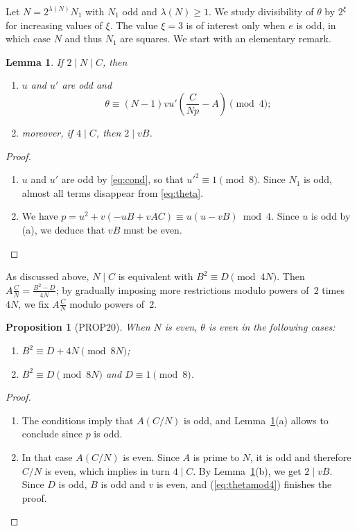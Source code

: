 \documentclass[12pt,twoside,leqno]{article}
\newtheorem{proposition}[theorem]{Proposition}
\newtheorem{lemma}[theorem]{Lemma}
\numberwithin{equation}{section}
\renewcommand{\geq}{\geqslant}
\newenvironment {alphenumerate}
   {\renewcommand {\labelenumi}{(\alph {enumi})}
    \renewcommand {\labelenumii}{(\alph {enumi}\arabic {enumii})}
    \begin {enumerate}}
   {\end {enumerate}}
\begin{document}
Let $N = 2^{\lambda (N)} N_1$ with $N_1$ odd and
$\lambda (N) \geq 1$. We study divisibility of $\theta$ by
$2^{\xi}$ for increasing values of $\xi$. The value $\xi = 3$ is
of interest only when $e$ is odd, in which case $N$ and thus $N_1$
are squares. We start with an elementary remark.

\begin{lemma}\label{lem:thetamod4}
If $2 \mid N\mid C$, then
\begin {alphenumerate}
\item
$u$ and $u'$ are odd and
\begin{equation}\label{eq:thetamod4}
\theta \equiv (N-1) v u' \left(\frac{C}{Np} - A\right) \pmod 4;
\end{equation}
\item
moreover, if $4\mid C$, then $2\mid v B$.
\end {alphenumerate}
\end{lemma}

\begin{proof}
\begin {alphenumerate}
\item
$u$ and $u'$ are odd by \eqref {eq:cond},
so that ${u'}^2\equiv 1\pmod 8$. Since $N_1$ is odd, almost all terms
disappear from \eqref{eq:theta}.
\item
We have $p = u^2 + v (-u B + v A C)\equiv u (u - v B) \bmod
4$. Since $u$ is odd by (a), we deduce that $v B$ must be even.
\end {alphenumerate}
\end{proof}

As discussed above, $N \mid C$ is equivalent with
$B^2 \equiv D \pmod {4 N}$. Then
$A \frac {C}{N} = \frac {B^2 - D}{4 N}$; by gradually imposing more
restrictions modulo powers of~$2$ times $4 N$, we fix $A \frac {C}{N}$
modulo powers of~$2$.

\begin{proposition}[PROP20]\label{prop:Neventheta2}
When $N$ is even, $\theta$ is even in the following cases:
\begin {alphenumerate}
\item
$B^2 \equiv D + 4N \pmod {8N}$;
\item
$B^2 \equiv D \pmod {8N}$ and $D \equiv 1 \pmod 8$.
\end {alphenumerate}
\end{proposition}

\begin{proof}
\begin {alphenumerate}
\item
The conditions imply that $A (C/N)$ is odd, and
Lemma~\ref{lem:thetamod4}(a) allows to conclude since $p$ is odd.
\item
In that case $A (C/N)$ is even. Since $A$ is prime to $N$, it is
odd and therefore $C/N$ is even, which implies in turn $4 \mid C$.
By Lemma~\ref{lem:thetamod4}(b), we get $2 \mid v B$. Since
$D$ is odd, $B$ is odd and $v$ is even, and (\ref{eq:thetamod4})
finishes the proof.
\end {alphenumerate}
\end{proof}
\end{document}
